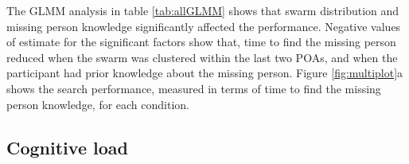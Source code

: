 \documentclass{article}
\begin{document}
	
	The GLMM analysis in table \ref{tab:allGLMM} shows that swarm distribution and missing person knowledge significantly affected the performance. Negative values of estimate for the significant factors show that, time to find the missing person reduced when the swarm was clustered within the last two POAs, and when the participant had prior knowledge about the missing person. Figure \ref{fig:multiplot}a shows the search performance, measured in terms of time to find the missing person knowledge, for each condition.
	
	
	
	
	
	\subsection{Cognitive load}
	
	
	
\end{document}
